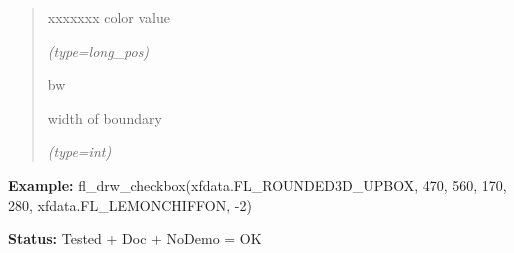 \begin{boxedminipage}{\funcwidth}
\begin{quote}
\begin{Ventry}{xxxxxxx}
          color value

            {\it (type=long\_pos)}

          \item[bw]

          width of boundary

            {\it (type=int)}

        \end{Ventry}

      \end{quote}

\textbf{Example:} fl\_drw\_checkbox(xfdata.FL\_ROUNDED3D\_UPBOX, 470, 560, 170, 280, 
xfdata.FL\_LEMONCHIFFON, -2)



\textbf{Status:} Tested + Doc + NoDemo = OK



    \end{boxedminipage}

    \label{xformslib:flxbasic:fl_get_fontstruct}

    \vspace{0.5ex}


